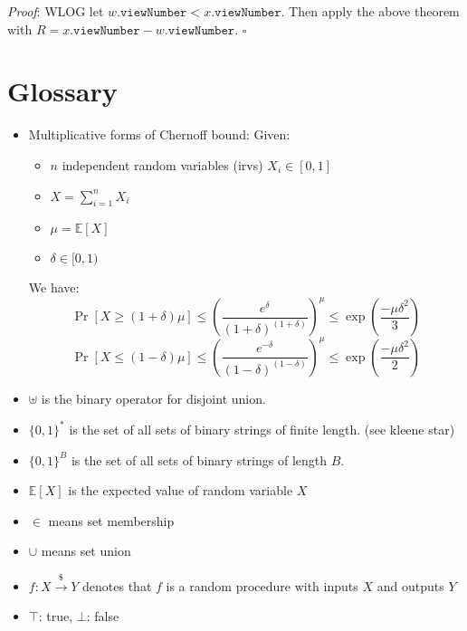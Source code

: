 \documentclass[11pt, oneside]{article}       %
\begin{document}
\emph{Proof}: WLOG let \(w\texttt{.viewNumber} < x\texttt{.viewNumber}\).
Then apply the above theorem with \(R = x\texttt{.viewNumber} -
w\texttt{.viewNumber}\). \(\square\)


\section{Glossary}

\begin{itemize}
    \item Multiplicative forms of Chernoff bound:
        Given:
        \begin{itemize}
            \item $n$ independent random variables (irvs) $X_i \in [0, 1]$
            \item $X = \sum_{i=1}^n X_i$
            \item $\mu = \mathbb{E}\left[X\right]$
            \item $\delta \in [0, 1)$
        \end{itemize}
        We have:
        \[\Pr[X \geq(1+\delta) \mu] \leq\left(\frac{e^{\delta}}{(1+\delta)^{(1+\delta)}}\right)^{\mu} \leq \exp \left(\frac{-\mu \delta^{2}}{3}\right)\]
        \[\Pr[X \leq(1-\delta) \mu] \leq\left(\frac{e^{-\delta}}{(1-\delta)^{(1-\delta)}}\right)^{\mu} \leq \exp \left(\frac{-\mu \delta^{2}}{2}\right)\]
        \item $\uplus$ is the binary operator for disjoint union.
        \item $\{0, 1\}^*$ is the set of all sets of binary strings of finite length. (see kleene star)
        \item $\{0, 1\}^B$ is the set of all sets of binary strings of length $B$.
        \item $\mathbb{E}[X]$ is the expected value of random variable $X$
        \item $\in$ means set membership
        \item $\cup$ means set union
        \item $ f: X \xrightarrow{\$} Y$ denotes that \(f\) is a
            random procedure with inputs \(X\) and outputs \(Y\)
        \item $\top$: true, $\bot$: false

\end{itemize}
\end{document}
